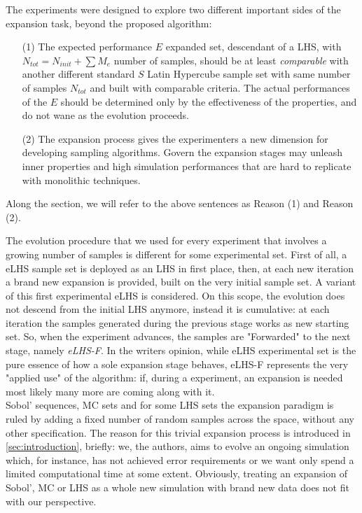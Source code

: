 \documentclass[12pt]{extarticle}
\begin{document}
The experiments were designed to explore two different important sides of the expansion task, beyond the proposed algorithm:

\begin{enumerate}
\item[(1)] The expected performance $E$ expanded set, descendant of a LHS, with $N_{tot} = N_{init} + \sum{M_e} $ number of samples, should be at least \textit{comparable} with another different standard $S$ Latin Hypercube sample set with same number of samples $N_{tot}$ and built with comparable criteria. The actual performances of the  $E$ should be determined only by the effectiveness of the properties, and do not wane as the evolution proceeds. 

\item[(2)] The expansion process gives the experimenters a new dimension for developing sampling algorithms. Govern the expansion stages may unleash inner properties and high simulation performances that are hard to replicate with monolithic techniques.

\end{enumerate}

Along the section, we will refer to the above sentences as Reason (1) and Reason (2).

The evolution procedure that we used for every experiment that involves a growing number of samples is different for some experimental set. First of all, a eLHS sample set is deployed as an LHS in first place, then, at each new iteration a brand new expansion is provided, built on the very initial sample set. 
A variant of this first experimental eLHS is considered. On this scope, the evolution does not descend from the initial LHS anymore, instead it is cumulative: at each iteration the samples generated during the previous stage works as new starting set. So, when the experiment advances, the samples are "Forwarded" to the next stage, namely \textit{eLHS-F}. In the writers opinion, while eLHS experimental set is the pure essence of how a sole expansion stage behaves, eLHS-F represents the very "applied use" of the algorithm: if, during a experiment, an expansion is needed most likely many more are coming along with it.\\
Sobol' sequences, MC sets and for some LHS sets the expansion paradigm is ruled by adding a fixed number of random samples across the space, without any other specification. The reason for this trivial expansion process is introduced in \cref{sec:introduction}, briefly: we, the authors, aims to evolve an ongoing simulation which, for instance, has not achieved error requirements or we want only spend a limited computational time at some extent. Obviously, treating an expansion of Sobol', MC or LHS as a whole new simulation with brand new data does not fit with our perspective.
\end{document}
